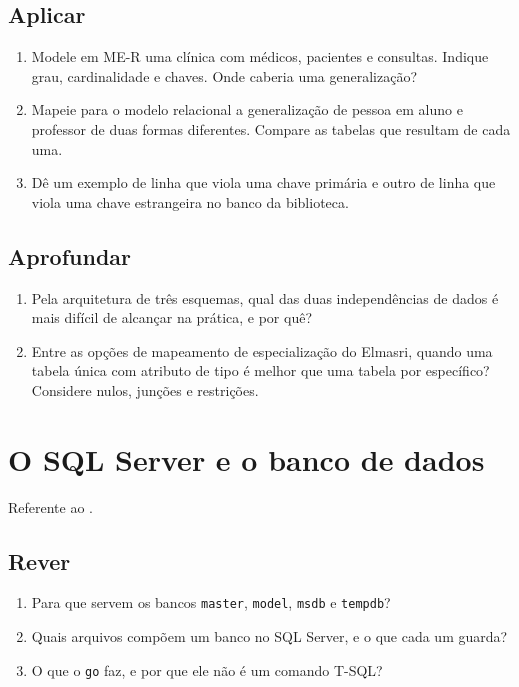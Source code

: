 \subsection*{Aplicar}
\begin{enumerate}
	\item Modele em ME-R uma clínica com médicos, pacientes e consultas.
	Indique grau, cardinalidade e chaves. Onde caberia uma generalização?
	\item Mapeie para o modelo relacional a generalização de pessoa em
	aluno e professor de duas formas diferentes. Compare as tabelas que
	resultam de cada uma.
	\item Dê um exemplo de linha que viola uma chave primária e outro de
	linha que viola uma chave estrangeira no banco da biblioteca.
\end{enumerate}

\subsection*{Aprofundar}
\begin{enumerate}
	\item Pela arquitetura de três esquemas, qual das duas independências
	de dados é mais difícil de alcançar na prática, e por quê?
	\item Entre as opções de mapeamento de especialização do Elmasri,
	quando uma tabela única com atributo de tipo é melhor que uma tabela
	por específico? Considere nulos, junções e restrições.
\end{enumerate}

\section{O SQL Server e o banco de dados}

Referente ao .

\subsection*{Rever}
\begin{enumerate}
	\item Para que servem os bancos \texttt{master}, \texttt{model},
	\texttt{msdb} e \texttt{tempdb}?
	\item Quais arquivos compõem um banco no SQL Server, e o que cada um
	guarda?
	\item O que o \texttt{go} faz, e por que ele não é um comando T-SQL?
\end{enumerate}

